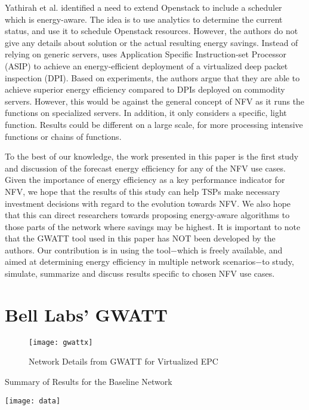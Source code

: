 \documentclass[conference]{IEEEtran}
\begin{document}
Yathirah et al. \cite{Yathiraj} identified a need to extend Openstack to include a scheduler which is energy-aware. The idea is to use analytics to determine the current status, and use it to schedule Openstack resources. However, the authors do not give any details about solution or the actual resulting energy savings. Instead of relying on generic servers, \cite{Koji14} uses Application Specific Instruction-set Processor (ASIP) to achieve an energy-efficient deployment of a virtualized deep packet inspection (DPI). Based on experiments, the authors argue that they are able to achieve superior energy efficiency compared to DPIs deployed on commodity servers. However, this would be against the general concept of NFV as it runs the functions on specialized servers. In addition, it only considers a specific, light function. Results could be different on a large scale, for more processing intensive functions or chains of functions.

\indent To the best of our knowledge, the work presented in this paper is the first study and discussion of the forecast energy efficiency for any of the NFV use cases. Given the importance of energy efficiency as a key performance indicator for NFV, we hope that the results of this study can help \acp{TSP} make necessary investment decisions with regard to the evolution towards \ac{NFV}. We also hope that this can direct researchers towards proposing energy-aware algorithms to those parts of the network where savings may be highest. It is important to note that the GWATT tool used in this paper has NOT been developed by the authors. Our contribution is in using the tool$-$which is freely available, and aimed at determining energy efficiency in multiple network scenarios$-$to study, simulate, summarize and discuss results specific to chosen NFV use cases.

\section{Bell Labs' GWATT}\label{tool}
 \begin{figure*}[t]
\begin{minipage}{.99\textwidth}
\centering
\resizebox{1.02\textwidth}{!}
{\texttt{[image: gwattx]}}
  \caption{Network Details from GWATT for Virtualized EPC}
  \label{tool1}
\end{minipage}
\end{figure*}
 \begin{table*}[!htbp]
\caption{Summary of Results for the Baseline Network}
\label{data}
\centering
\texttt{[image: data]}
\end{table*}
\end{document}
